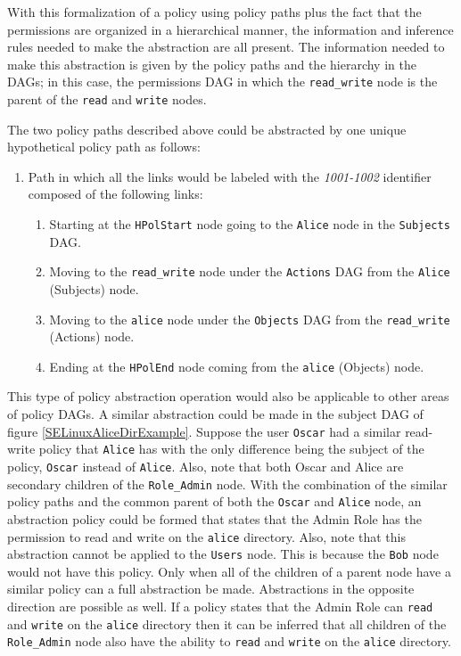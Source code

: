 \documentclass[12pt,letterpaper]{report}
\newcommand{\node}[1]{\texttt{#1}}
\begin{document}
With this formalization of a policy using policy paths plus the fact that the permissions are organized in a hierarchical manner, the information and inference rules needed to make the abstraction are all present. The information needed to make this abstraction is given by the policy paths and the hierarchy in the DAGs; in this case, the permissions DAG in which the \node{read\_write} node is the parent of the \node{read} and \node{write} nodes. 

{The two policy paths described above could be abstracted by one unique hypothetical policy path as follows:}

\begin{enumerate}
	\item%
	{Path in which all the links would be labeled with the \textit{1001-1002} identifier composed of the following links:
		\begin{enumerate}
			\item%
			Starting at the \node{HPolStart} node going to the \node{Alice} node in the \texttt{Subjects} DAG.
			\item%
			Moving to the \node{read\_write} node under the \texttt{Actions} DAG from the \node{Alice} (Subjects) node.
			\item%
			Moving to the \node{alice} node under the \texttt{Objects} DAG from the \node{read\_write} (Actions) node.
			\item%
			Ending at the \node{HPolEnd} node coming from the \node{alice} (Objects) node.
		\end{enumerate}
	}%
\end{enumerate}


This type of policy abstraction operation would also be applicable to other areas of policy DAGs. A similar abstraction could be made in the subject DAG of figure \ref{SELinuxAliceDirExample}. Suppose the user \node{Oscar} had a similar read-write policy that \node{Alice} has with the only difference being the subject of the policy, \node{Oscar} instead of \node{Alice}. Also, note that both Oscar and Alice are secondary children of the \node{Role\_Admin} node. With the combination of the similar policy paths and the common parent of both the \node{Oscar} and \node{Alice} node, an abstraction policy could be formed that states that the Admin Role has the permission to read and write on the \texttt{alice} directory. Also, note that this abstraction cannot be applied to the \node{Users} node. This is because the \node{Bob} node would not have this policy. Only when all of the children of a parent node have a similar policy can a full abstraction be made. Abstractions in the opposite direction are possible as well. If a policy states that the Admin Role can \texttt{read} and \texttt{write} on the \texttt{alice} directory then it can be inferred that all children of the \node{Role\_Admin} node also have the ability to \texttt{read} and \texttt{write} on the \texttt{alice} directory.
\end{document}
